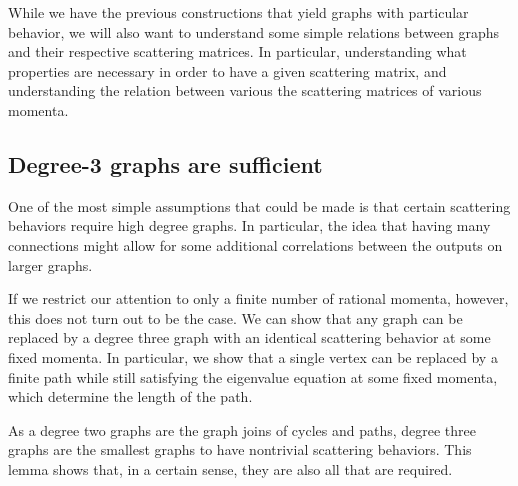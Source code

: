 \documentclass[../thesis-main/thesis-main]{subfiles}
\begin{document}
While we have the previous constructions that yield graphs with particular behavior, we will also want to understand some simple relations between graphs and their respective scattering matrices.  In particular, understanding what properties are necessary in order to have a given scattering matrix, and understanding the relation between various the scattering matrices of various momenta.

\subsection{Degree-3 graphs are sufficient}

One of the most simple assumptions that could be made is that certain scattering behaviors require high degree graphs.  In particular, the idea that having many connections might allow for some additional correlations between the outputs on larger graphs.  

If we restrict our attention to only a finite number of rational momenta, however, this does not turn out to be the case.  We can show that any graph can be replaced by a degree three graph with an identical scattering behavior at some fixed momenta.  In particular, we show that a single vertex can be replaced by a finite path while still satisfying the eigenvalue equation at some fixed momenta, which determine the length of the path.

As a degree two graphs are the graph joins of cycles and paths, degree three graphs are the smallest graphs to have nontrivial scattering behaviors.  This lemma shows that, in a certain sense, they are also all that are required.
\end{document}
